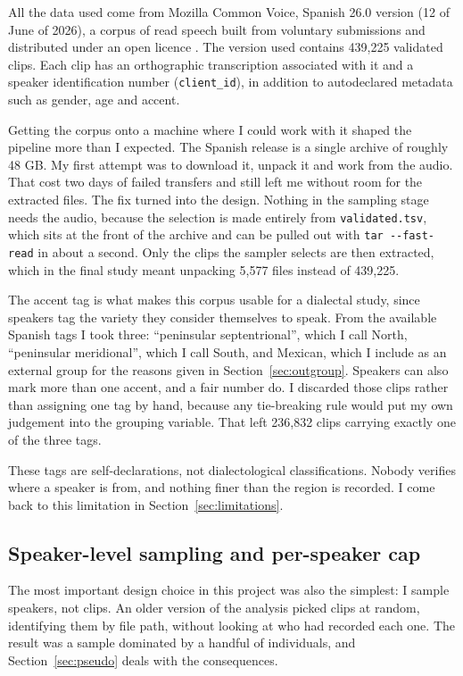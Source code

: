 \documentclass[11pt]{article}
\begin{document}
All the data used come from Mozilla Common Voice, Spanish 26.0 version (12 of
June of 2026), a corpus of read speech built from voluntary submissions and
distributed under an open licence \citep{ardila2020}. The version used contains
439,225 validated clips. Each clip has an orthographic transcription associated
with it and a speaker identification number (\texttt{client\_id}), in addition to
autodeclared metadata such as gender, age and accent.

Getting the corpus onto a machine where I could work with it shaped the pipeline
more than I expected. The Spanish release is a single archive of roughly 48 GB.
My first attempt was to download it, unpack it and work from the audio. That cost
two days of failed transfers and still left me without room for the extracted
files. The fix turned into the design. Nothing in the sampling stage needs the
audio, because the selection is made entirely from \texttt{validated.tsv}, which
sits at the front of the archive and can be pulled out with
\texttt{tar -{}-fast-read} in about a second. Only the clips the sampler selects
are then extracted, which in the final study meant unpacking 5,577 files instead
of 439,225.

The accent tag is what makes this corpus usable for a dialectal study, since
speakers tag the variety they consider themselves to speak. From the available
Spanish tags I took three: ``peninsular septentrional'', which I call North,
``peninsular meridional'', which I call South, and Mexican, which I include as an
external group for the reasons given in Section~\ref{sec:outgroup}. Speakers can
also mark more than one accent, and a fair number do. I discarded those clips
rather than assigning one tag by hand, because any tie-breaking rule would put my
own judgement into the grouping variable. That left 236,832 clips carrying
exactly one of the three tags.

These tags are self-declarations, not dialectological classifications. Nobody
verifies where a speaker is from, and nothing finer than the region is recorded.
I come back to this limitation in Section~\ref{sec:limitations}.

\subsection{Speaker-level sampling and per-speaker cap}

The most important design choice in this project was also the simplest: I sample
speakers, not clips. An older version of the analysis picked clips at random,
identifying them by file path, without looking at who had recorded each one. The
result was a sample dominated by a handful of individuals, and
Section~\ref{sec:pseudo} deals with the consequences.
\end{document}
